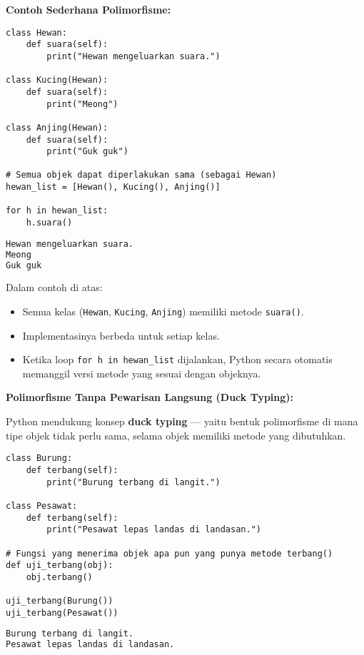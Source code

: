 \textbf{Contoh Sederhana Polimorfisme:}

\begin{lstlisting}[style=PythonStyle, caption={Polimorfisme dengan Overriding}]
class Hewan:
    def suara(self):
        print("Hewan mengeluarkan suara.")

class Kucing(Hewan):
    def suara(self):
        print("Meong")

class Anjing(Hewan):
    def suara(self):
        print("Guk guk")

# Semua objek dapat diperlakukan sama (sebagai Hewan)
hewan_list = [Hewan(), Kucing(), Anjing()]

for h in hewan_list:
    h.suara()
\end{lstlisting}

\begin{lstlisting}[language=bash, caption={Output Program}]
Hewan mengeluarkan suara.
Meong
Guk guk
\end{lstlisting}

Dalam contoh di atas:
\begin{itemize}
    \item Semua kelas (\texttt{Hewan}, \texttt{Kucing}, \texttt{Anjing}) memiliki metode \texttt{suara()}.
    \item Implementasinya berbeda untuk setiap kelas.
    \item Ketika loop \texttt{for h in hewan\_list} dijalankan, Python secara otomatis memanggil versi metode yang sesuai dengan objeknya.
\end{itemize}

\textbf{Polimorfisme Tanpa Pewarisan Langsung (Duck Typing):}

Python mendukung konsep \textbf{duck typing} —  
yaitu bentuk polimorfisme di mana tipe objek tidak perlu sama, selama objek memiliki metode yang dibutuhkan.

\begin{lstlisting}[style=PythonStyle, caption={Contoh Duck Typing}]
class Burung:
    def terbang(self):
        print("Burung terbang di langit.")

class Pesawat:
    def terbang(self):
        print("Pesawat lepas landas di landasan.")

# Fungsi yang menerima objek apa pun yang punya metode terbang()
def uji_terbang(obj):
    obj.terbang()

uji_terbang(Burung())
uji_terbang(Pesawat())
\end{lstlisting}

\begin{lstlisting}[language=bash, caption={Output Program}]
Burung terbang di langit.
Pesawat lepas landas di landasan.
\end{lstlisting}


